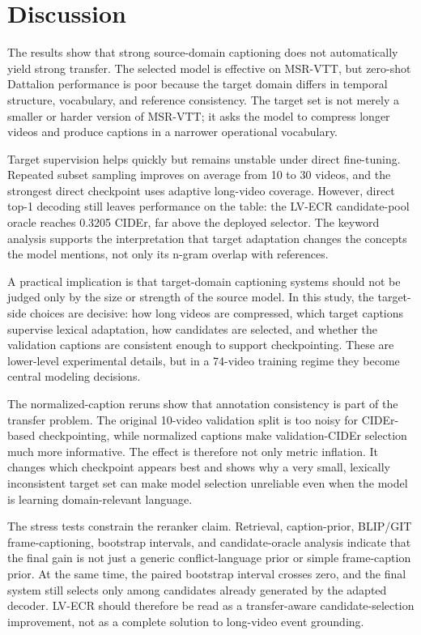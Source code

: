\documentclass[pdflatex,sn-mathphys-num]{sn-jnl}
\theoremstyle{thmstyleone}
\theoremstyle{thmstyletwo}
\theoremstyle{thmstylethree}
\begin{document}
\section{Discussion}\label{sec7}
The results show that strong source-domain captioning does not automatically yield strong transfer. The selected model is effective on MSR-VTT, but zero-shot Dattalion performance is poor because the target domain differs in temporal structure, vocabulary, and reference consistency. The target set is not merely a smaller or harder version of MSR-VTT; it asks the model to compress longer videos and produce captions in a narrower operational vocabulary.

Target supervision helps quickly but remains unstable under direct fine-tuning. Repeated subset sampling improves on average from 10 to 30 videos, and the strongest direct checkpoint uses adaptive long-video coverage. However, direct top-1 decoding still leaves performance on the table: the LV-ECR candidate-pool oracle reaches 0.3205 CIDEr, far above the deployed selector. The keyword analysis supports the interpretation that target adaptation changes the concepts the model mentions, not only its n-gram overlap with references.

A practical implication is that target-domain captioning systems should not be judged only by the size or strength of the source model. In this study, the target-side choices are decisive: how long videos are compressed, which target captions supervise lexical adaptation, how candidates are selected, and whether the validation captions are consistent enough to support checkpointing. These are lower-level experimental details, but in a 74-video training regime they become central modeling decisions.

The normalized-caption reruns show that annotation consistency is part of the transfer problem. The original 10-video validation split is too noisy for CIDEr-based checkpointing, while normalized captions make validation-CIDEr selection much more informative. The effect is therefore not only metric inflation. It changes which checkpoint appears best and shows why a very small, lexically inconsistent target set can make model selection unreliable even when the model is learning domain-relevant language.

The stress tests constrain the reranker claim. Retrieval, caption-prior, BLIP/GIT frame-captioning, bootstrap intervals, and candidate-oracle analysis indicate that the final gain is not just a generic conflict-language prior or simple frame-caption prior. At the same time, the paired bootstrap interval crosses zero, and the final system still selects only among candidates already generated by the adapted decoder. LV-ECR should therefore be read as a transfer-aware candidate-selection improvement, not as a complete solution to long-video event grounding.
\end{document}
